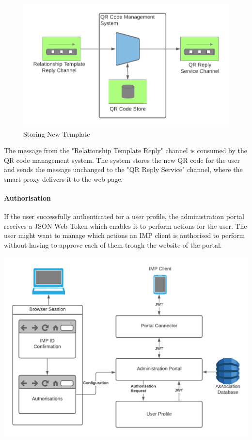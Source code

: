 \documentclass[
     12pt,         %
     a4paper,      %
     BCOR=10mm,version=first,     %
     DIV=14,version=first,        %
     ]{scrreprt}
\begin{document}
\begin{figure}[h]
\caption{Storing New Template}
    \centering
    \includegraphics[scale=0.3]{Diagrams/Integration 1/Connection/Messaging 7.png}
\end{figure}

The message from the "Relationship Template Reply" channel is consumed by the QR code management system. The system stores the new QR code for the user and sends the message unchanged to the "QR Reply Service" channel, where the smart proxy delivers it to the web page.

\paragraph{Authorisation}

If the user successfully authenticated for a user profile, the administration portal receives a JSON Web Token which enables it to perform actions for the user. The user might want to manage which actions an IMP client is authorised to perform without having to approve each of them trough the website of the portal.

\begin{center}
    \includegraphics[scale=0.3]{Diagrams/Integration 1/Authorisation/Overview.png}
\end{center}
\end{document}
